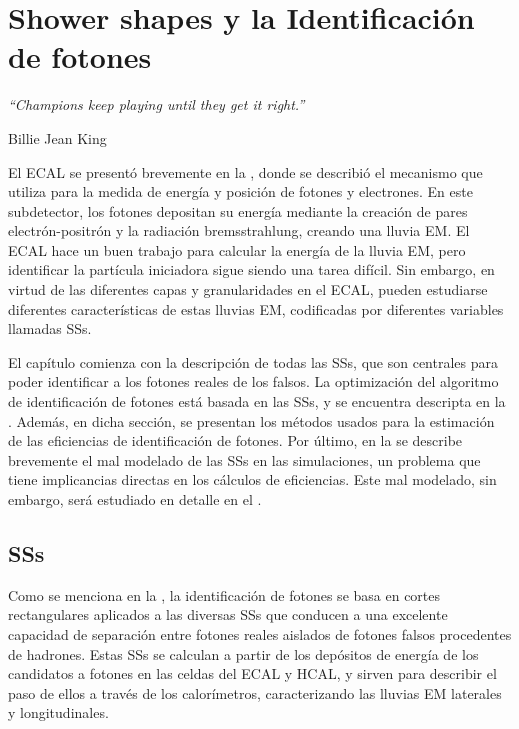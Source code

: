 \chapter{Shower shapes y la Identificaci\'on de fotones}
\label{ch:pid_ss}
\epigraph{\emph{“Champions keep playing until they get it right.”}}{Billie Jean King}



El \ac{ECAL} se presentó brevemente en la \Sect{\ref{subsubsec:atlas:atlas:cals:ecal}}, donde se describió el mecanismo que utiliza para la medida de energ\'ia y posici\'on de fotones y electrones. En este subdetector, los fotones depositan su energía mediante la creación de pares electrón-positrón y la radiación bremsstrahlung, creando una lluvia \acf{EM}. El \ac{ECAL} hace un buen trabajo para calcular la energía de la lluvia \ac{EM}, pero identificar la partícula iniciadora sigue siendo una tarea difícil.
Sin embargo, en virtud de las diferentes capas y granularidades en el \ac{ECAL}, pueden estudiarse diferentes características de estas lluvias \ac{EM}, codificadas por diferentes variables llamadas \acfp{SS}.

El cap\'itulo comienza con la descripci\'on de todas las \acp{SS}, que son centrales para poder identificar a los fotones reales de los falsos.
La optimizaci\'on del algoritmo de identificaci\'on de fotones est\'a basada en las \acp{SS}, y se encuentra descripta en la \Sect{\ref{sec:pid_ss:pid}}. Adem\'as, en dicha secci\'on, se presentan los m\'etodos usados para la estimaci\'on de las eficiencias de identificaci\'on de fotones.
Por último, en la \Sect{\ref{sec:pid_ss:ss_differences}} se describe brevemente el mal modelado de las \acp{SS} en las simulaciones, un problema que tiene implicancias directas en los c\'alculos de eficiencias. Este mal modelado, sin embargo, ser\'a estudiado en detalle en el \Ch{\ref{ch:ss_corrections}}.






\section{\acfp{SS}}
\label{sec:pid_ss:ss}

Como se menciona en la \Sect{\ref{subsec:objects:egamma:id}}, la identificación de fotones se basa en cortes rectangulares aplicados a las diversas \acp{SS} que conducen a una excelente capacidad de separación entre fotones reales aislados de fotones falsos procedentes de hadrones. Estas \acp{SS} se calculan a partir de los depósitos de energía de los candidatos a fotones en las celdas del \ac{ECAL} y \ac{HCAL}, y sirven para describir el paso de ellos a través de los calorímetros, caracterizando las lluvias \ac{EM} laterales y longitudinales.

